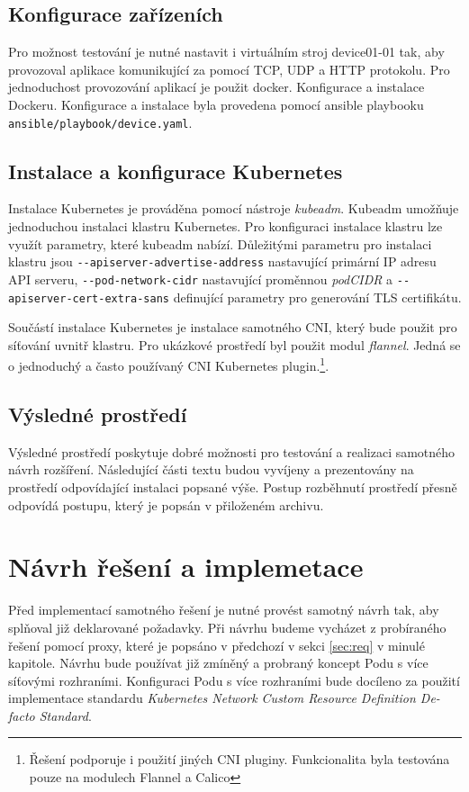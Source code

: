 \subsection{Konfigurace zařízeních}
Pro možnost testování je nutné nastavit i virtuálním stroj device01-01 tak, aby provozoval aplikace komunikující za pomocí TCP, UDP a HTTP protokolu. Pro jednoduchost provozování aplikací je použit docker. Konfigurace a instalace Dockeru. Konfigurace a instalace byla provedena pomocí ansible playbooku \verb|ansible/playbook/device.yaml|.
\subsection{Instalace a konfigurace Kubernetes}
Instalace Kubernetes je prováděna pomocí nástroje \textit{kubeadm}. Kubeadm umožňuje jednoduchou instalaci klastru Kubernetes. Pro konfiguraci instalace klastru lze využít parametry, které kubeadm nabízí. Důležitými parametru pro instalaci klastru jsou \verb|--apiserver-advertise-address| nastavující primární IP adresu API serveru, \verb|--pod-network-cidr| nastavující proměnnou \textit{podCIDR} a \verb|--apiserver-cert-extra-sans| definující parametry pro generování TLS certifikátu.
 
Součástí instalace Kubernetes je instalace samotného CNI, který bude použit pro síťování uvnitř klastru. Pro ukázkové prostředí byl použit modul \textit{flannel}. Jedná se o jednoduchý a často používaný CNI Kubernetes plugin.\footnote{Řešení podporuje i použití jiných CNI pluginy. Funkcionalita byla testována pouze na modulech Flannel a Calico}.

\subsection{Výsledné prostředí}
Výsledné prostředí poskytuje dobré možnosti pro testování a realizaci samotného návrh rozšíření. Následující části textu budou vyvíjeny a prezentovány na prostředí odpovídající instalaci popsané výše. Postup rozběhnutí prostředí přesně odpovídá postupu, který je popsán v přiloženém archivu. 

\section{Návrh řešení a implemetace}
Před implementací samotného řešení je nutné provést samotný návrh tak, aby splňoval již deklarované požadavky. Při návrhu budeme vycházet z probíraného řešení pomocí proxy, které je popsáno v předchozí v sekci \ref{sec:req} v minulé kapitole. Návrhu bude používat již zmíněný a probraný koncept Podu s více síťovými rozhraními. Konfiguraci Podu s více rozhraními bude docíleno za použití implementace standardu \textit{Kubernetes Network Custom Resource Definition De-facto Standard}.

